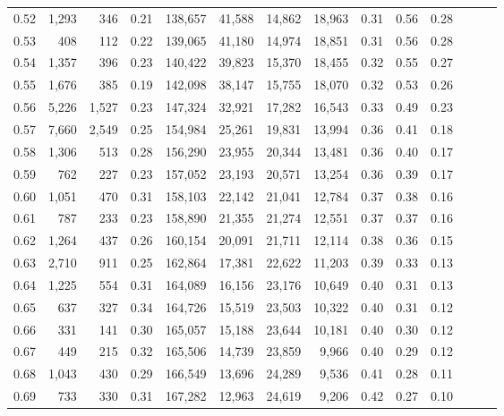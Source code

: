 \begin{tabular}{rrrrrrrrrrrrrr}
0.52 &   1,293 &    346 &  0.21 &  138,657 &   41,588 &  14,862 &  18,963 &  0.31 &  0.56 &      0.28 \\
0.53 &     408 &    112 &  0.22 &  139,065 &   41,180 &  14,974 &  18,851 &  0.31 &  0.56 &      0.28 \\
0.54 &   1,357 &    396 &  0.23 &  140,422 &   39,823 &  15,370 &  18,455 &  0.32 &  0.55 &      0.27 \\
0.55 &   1,676 &    385 &  0.19 &  142,098 &   38,147 &  15,755 &  18,070 &  0.32 &  0.53 &      0.26 \\
0.56 &   5,226 &  1,527 &  0.23 &  147,324 &   32,921 &  17,282 &  16,543 &  0.33 &  0.49 &      0.23 \\
0.57 &   7,660 &  2,549 &  0.25 &  154,984 &   25,261 &  19,831 &  13,994 &  0.36 &  0.41 &      0.18 \\
0.58 &   1,306 &    513 &  0.28 &  156,290 &   23,955 &  20,344 &  13,481 &  0.36 &  0.40 &      0.17 \\
0.59 &     762 &    227 &  0.23 &  157,052 &   23,193 &  20,571 &  13,254 &  0.36 &  0.39 &      0.17 \\
0.60 &   1,051 &    470 &  0.31 &  158,103 &   22,142 &  21,041 &  12,784 &  0.37 &  0.38 &      0.16 \\
0.61 &     787 &    233 &  0.23 &  158,890 &   21,355 &  21,274 &  12,551 &  0.37 &  0.37 &      0.16 \\
0.62 &   1,264 &    437 &  0.26 &  160,154 &   20,091 &  21,711 &  12,114 &  0.38 &  0.36 &      0.15 \\
0.63 &   2,710 &    911 &  0.25 &  162,864 &   17,381 &  22,622 &  11,203 &  0.39 &  0.33 &      0.13 \\
0.64 &   1,225 &    554 &  0.31 &  164,089 &   16,156 &  23,176 &  10,649 &  0.40 &  0.31 &      0.13 \\
0.65 &     637 &    327 &  0.34 &  164,726 &   15,519 &  23,503 &  10,322 &  0.40 &  0.31 &      0.12 \\
0.66 &     331 &    141 &  0.30 &  165,057 &   15,188 &  23,644 &  10,181 &  0.40 &  0.30 &      0.12 \\
0.67 &     449 &    215 &  0.32 &  165,506 &   14,739 &  23,859 &   9,966 &  0.40 &  0.29 &      0.12 \\
0.68 &   1,043 &    430 &  0.29 &  166,549 &   13,696 &  24,289 &   9,536 &  0.41 &  0.28 &      0.11 \\
0.69 &     733 &    330 &  0.31 &  167,282 &   12,963 &  24,619 &   9,206 &  0.42 &  0.27 &      0.10 \\

\end{tabular}
